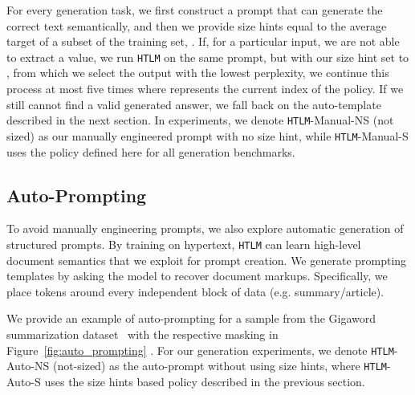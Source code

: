 \documentclass[11pt,a4paper]{article}
\newcommand{\HTLM}{\texttt{HTLM}}
\begin{document}
For every generation task, we first construct a prompt that can generate the correct text semantically, and then we provide size hints equal to the average target of a subset of the training set, . If, for a particular input, we are not able to extract a value, we run \HTLM{} on the same prompt, but with our size hint set to , from which we select the output with the lowest perplexity, we continue this process at most five times where  represents the current index of the policy. If we still cannot find a valid generated answer, we fall back on the auto-template described in the next section. In experiments, we denote \HTLM{}-Manual-NS (not sized) as our manually engineered prompt with no size hint, while \HTLM{}-Manual-S uses the policy defined here for all generation benchmarks.


\subsection{Auto-Prompting}
To avoid manually engineering prompts, we also explore automatic generation of structured prompts.
By training on hypertext, \HTLM{} can learn high-level document semantics that we exploit for prompt creation. We generate prompting templates by asking the model to recover document markups. Specifically, we place \textit{} tokens around every independent block of data (e.g. summary/article).

We provide an example of auto-prompting for a sample from the Gigaword summarization dataset~\citep{gigaword} with the respective masking in Figure~\ref{fig:auto_prompting} . For our generation experiments, we denote \HTLM{}-Auto-NS (not-sized) as the auto-prompt without using size hints, where \HTLM{}-Auto-S uses the size hints based policy described in the previous section.
\end{document}
